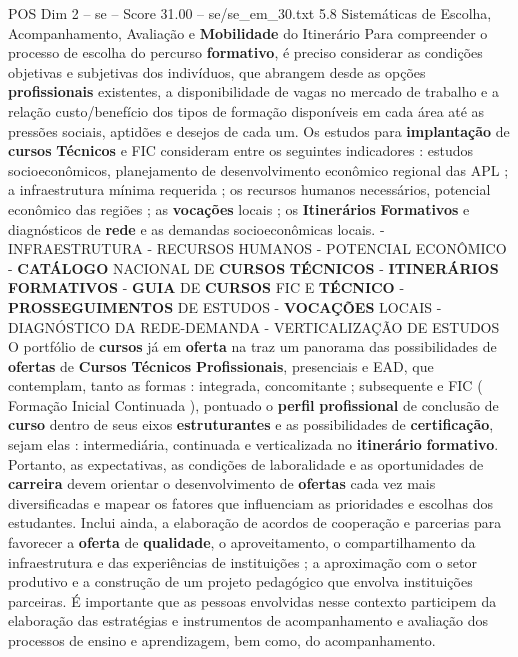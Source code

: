 \begin{textsample}{POS Dim 2 – se – Score 31.00 – se/se\_em\_30.txt}  \label{ex:f2_pos_022}
5.8 Sistemáticas de Escolha, Acompanhamento, Avaliação e \textbf{Mobilidade} do Itinerário Para compreender o processo de escolha do percurso \textbf{formativo}, é preciso considerar as condições objetivas e subjetivas dos indivíduos, que abrangem desde as opções \textbf{profissionais} existentes, a disponibilidade de vagas no mercado de trabalho e a relação custo/benefício dos tipos de formação disponíveis em cada área até as pressões sociais, aptidões e desejos de cada um.
Os estudos para \textbf{implantação} de \textbf{cursos} \textbf{Técnicos} e FIC consideram entre os seguintes indicadores : estudos socioeconômicos, planejamento de desenvolvimento econômico regional das APL ; a infraestrutura mínima requerida ; os recursos humanos necessários, potencial econômico das regiões ; as \textbf{vocações} locais ; os \textbf{Itinerários} \textbf{Formativos} e diagnósticos de \textbf{rede} e as demandas socioeconômicas locais. - INFRAESTRUTURA - RECURSOS HUMANOS - POTENCIAL ECONÔMICO - \textbf{CATÁLOGO} NACIONAL DE \textbf{CURSOS} \textbf{TÉCNICOS} - \textbf{ITINERÁRIOS} \textbf{FORMATIVOS} - \textbf{GUIA} DE \textbf{CURSOS} FIC E \textbf{TÉCNICO} - \textbf{PROSSEGUIMENTOS} DE ESTUDOS - \textbf{VOCAÇÕES} LOCAIS - DIAGNÓSTICO DA REDE-DEMANDA - VERTICALIZAÇÃO DE ESTUDOS O portfólio de \textbf{cursos} já em \textbf{oferta} na traz um panorama das possibilidades de \textbf{ofertas} de \textbf{Cursos} \textbf{Técnicos} \textbf{Profissionais}, presenciais e EAD, que contemplam, tanto as formas : integrada, concomitante ; subsequente e FIC ( Formação Inicial Continuada ), pontuado o \textbf{perfil} \textbf{profissional} de conclusão de \textbf{curso} dentro de seus eixos \textbf{estruturantes} e as possibilidades de \textbf{certificação}, sejam elas : intermediária, continuada e verticalizada no \textbf{itinerário} \textbf{formativo}.
Portanto, as expectativas, as condições de laboralidade e as oportunidades de \textbf{carreira} devem orientar o desenvolvimento de \textbf{ofertas} cada vez mais diversificadas e mapear os fatores que influenciam as prioridades e escolhas dos estudantes.
Inclui ainda, a elaboração de acordos de cooperação e parcerias para favorecer a \textbf{oferta} de \textbf{qualidade}, o aproveitamento, o compartilhamento da infraestrutura e das experiências de instituições ; a aproximação com o setor produtivo e a construção de um projeto pedagógico que envolva instituições parceiras.
É importante que as pessoas envolvidas nesse contexto participem da elaboração das estratégias e instrumentos de acompanhamento e avaliação dos processos de ensino e aprendizagem, bem como, do acompanhamento.

\end{textsample}

